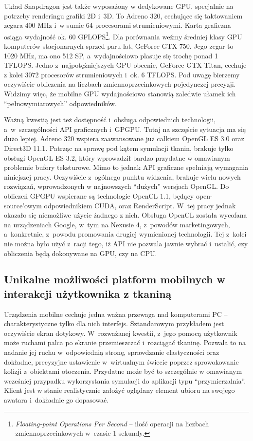 		Układ Snapdragon jest także wyposażony w dedykowane GPU, specjalnie na potrzeby renderingu grafiki 2D i~3D. To Adreno 320, cechujące się taktowaniem zegara 400 MHz i~w sumie 64 procesorami strumieniowymi. Karta graficzna osiąga wydajność ok. 60 GFLOPS\footnote{\emph{Floating-point Operations Per Second} -- ilość operacji na liczbach zmiennoprzecinkowych w~czasie 1 sekundy.}. Dla porównania weźmy średniej klasy GPU komputerów stacjonarnych sprzed paru lat, GeForce GTX 750. Jego zegar to 1020 MHz, ma ono 512 SP, a~wydajnościowo plasuje się trochę ponad 1 TFLOPS. Jedno z~najpotężniejszych GPU obecnie, GeForce GTX Titan, cechuje z kolei 3072 procesorów strumieniowych i~ok. 6 TFLOPS. Pod uwagę bierzemy oczywiście obliczenia na liczbach zmiennoprzecinkowych pojedynczej precyzji. Widzimy więc, że mobilne GPU wydajnościowo stanowią zaledwie ułamek ich ``pełnowymiarowych'' odpowiedników.
		
		Ważną kwestią jest też dostępność i~obsługa odpowiednich technologii, a~w~szczególności API graficznych i~GPGPU. Tutaj na szczęście sytuacja ma się dużo lepiej. Adreno 320 wspiera zaawansowane już całkiem OpenGL ES 3.0 oraz Direct3D 11.1. Patrząc na sprawę pod kątem symulacji tkanin, brakuje tylko obsługi OpenGL ES 3.2, który wprowadził bardzo przydatne w omawianym problemie bufory teksturowe. Mimo to jednak API graficzne spełniają wymagania niniejszej pracy. Oczywiście z~ogólnego punktu widzenia, brakuje wielu nowych rozwiązań, wprowadzonych w najnowszych ``dużych'' wersjach OpenGL. Do obliczeń GPGPU wspierane są technologie OpenCL 1.1, będący open-source'owym odpowiednikiem CUDA, oraz RenderScript. W~tej pracy jednak okazało się niemożliwe użycie żadnego z nich. Obsługa OpenCL została wycofana na urządzeniach Google, w~tym na Nexusie 4, z~powodów marketingowych, a~konkretnie, z~powodu promowania drugiej wymienionej technologii. Tej z~kolei nie można było użyć z~racji tego, iż API nie pozwala jawnie wybrać i~ustalić, czy obliczenia będą dokonywane na GPU, czy na CPU.
		
		\subsection{Unikalne możliwości platform mobilnych w interakcji użytkownika z tkaniną}
		\label{t:technologie:mobilne:interakcja}
		
		
		Urządzenia mobilne cechuje jedna ważna przewaga nad komputerami PC -- charakterystyczne tylko dla nich interfejs. Sztandarowym przykładem jest oczywiście ekran dotykowy. W~rozważanej kwestii, z~jego pomocą użytkownik może ruchami palca po ekranie przemieszczać i~rozciągać tkaninę. Pozwala to na nadanie jej ruchu w~odpowiednią stronę, sprawdzanie elastyczności oraz dokładne, precyzyjne ustawienie w~wirtualnym świecie poprzez sprowokowanie kolizji z~obiektami otoczenia. Przydatne może być to szczególnie w omawianym wcześniej przypadku wykorzystania symulacji do aplikacji typu ``przymierzalnia''. Klient jest w stanie realistycznie założyć oglądany element ubioru na swojego awatara i~dokładnie go dopasować. 
		
